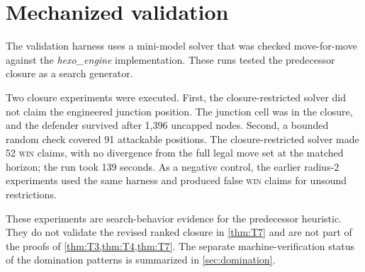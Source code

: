 \section{Mechanized validation}
\label{sec:validation}

The validation harness uses a mini-model solver that was checked
move-for-move against the \emph{hexo\_engine} implementation.  These runs
tested the predecessor closure as a search generator.

Two closure experiments were executed.  First, the closure-restricted solver
did not claim the engineered junction position.  The junction cell was in the
closure, and the defender survived after 1,396 uncapped nodes.  Second, a
bounded random check covered 91 attackable positions.  The closure-restricted
solver made 52 \textsc{win} claims, with no divergence from the full legal
move set at the matched horizon; the run took 139 seconds.  As a negative
control, the earlier radius-2 experiments used the same harness and produced
false \textsc{win} claims for unsound restrictions.

These experiments are search-behavior evidence for the predecessor heuristic.
They do not validate the revised ranked closure in \cref{thm:T7} and are not
part of the proofs of \cref{thm:T3,thm:T4,thm:T7}.  The separate
machine-verification status of the domination patterns is summarized in
\cref{sec:domination}.
